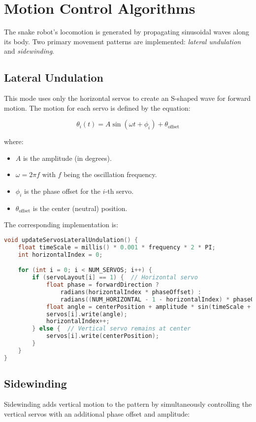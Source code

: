 \documentclass[12pt,a4paper]{report}
\begin{document}
\section{Motion Control Algorithms}
The snake robot’s locomotion is generated by propagating sinusoidal waves along its body. Two primary movement patterns are implemented: \emph{lateral undulation} and \emph{sidewinding}.

\subsection{Lateral Undulation}
This mode uses only the horizontal servos to create an S-shaped wave for forward motion. The motion for each servo is defined by the equation:

\[
\theta_i(t) = A \sin(\omega t + \phi_i) + \theta_{\text{offset}}
\]

where:
\begin{itemize}
    \item \(A\) is the amplitude (in degrees).
    \item \(\omega = 2\pi f\) with \(f\) being the oscillation frequency.
    \item \(\phi_i\) is the phase offset for the \(i\)-th servo.
    \item \(\theta_{\text{offset}}\) is the center (neutral) position.
\end{itemize}

The corresponding implementation is:

\begin{lstlisting}[language=C++]
void updateServosLateralUndulation() {
    float timeScale = millis() * 0.001 * frequency * 2 * PI;
    int horizontalIndex = 0;

    for (int i = 0; i < NUM_SERVOS; i++) {
        if (servoLayout[i] == 1) {  // Horizontal servo
            float phase = forwardDirection ? 
                radians(horizontalIndex * phaseOffset) : 
                radians((NUM_HORIZONTAL - 1 - horizontalIndex) * phaseOffset);
            float angle = centerPosition + amplitude * sin(timeScale + phase);
            servos[i].write(angle);
            horizontalIndex++;
        } else {  // Vertical servo remains at center
            servos[i].write(centerPosition);
        }
    }
}
\end{lstlisting}

\subsection{Sidewinding}
Sidewinding adds vertical motion to the pattern by simultaneously controlling the vertical servos with an additional phase offset and amplitude:
\end{document}
